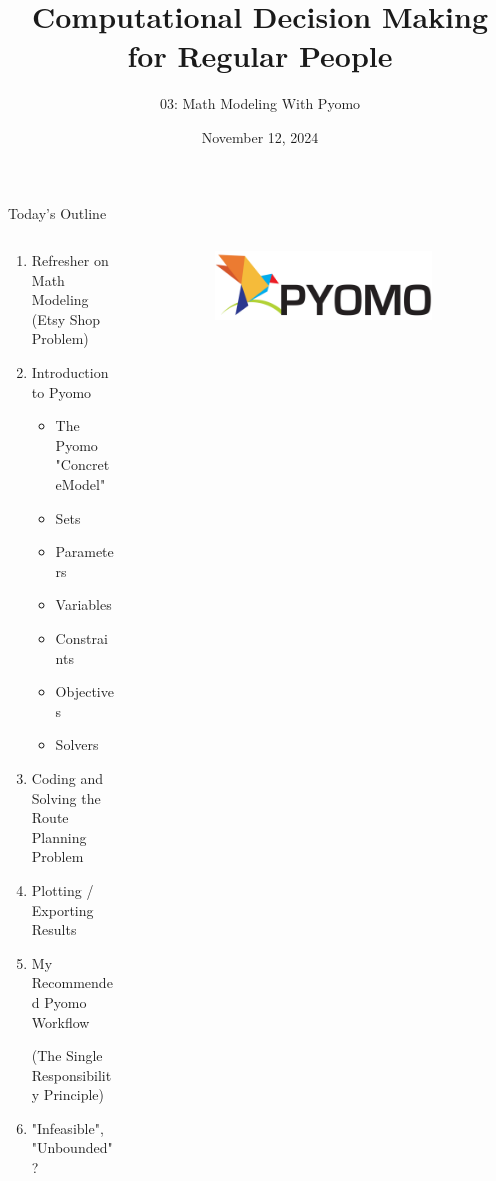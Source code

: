 \documentclass[10pt, aspectratio=169]{beamer}
\title{Computational Decision Making for Regular People}
\subtitle{03: Math Modeling With Pyomo}
\date{November 12, 2024}
\begin{document}
\begin{frame}
    \maketitle
\end{frame}

\begin{frame}{Today's Outline}
    \begin{columns}
        \begin{column}{0.5\textwidth}
            \begin{enumerate}
                \item Refresher on Math Modeling (Etsy Shop Problem)
                \item Introduction to Pyomo
                \begin{itemize}
                    \item The Pyomo "ConcreteModel"
                    \item Sets
                    \item Parameters
                    \item Variables
                    \item Constraints
                    \item Objectives
                    \item Solvers
                \end{itemize}
                \item Coding and Solving the Route Planning Problem
                \item Plotting / Exporting Results
                \item My Recommended Pyomo Workflow
                
                (The Single Responsibility Principle)
                \item "Infeasible", "Unbounded" ?
            \end{enumerate}
        \end{column}
        \begin{column}{0.5\textwidth}
            \begin{figure}
                \begin{figure}
                    \includegraphics[width=0.95\linewidth]{PyomoLogo.png}
                \end{figure}
            \end{figure}
        \end{column}
    \end{columns}
\end{frame}
\end{document}
